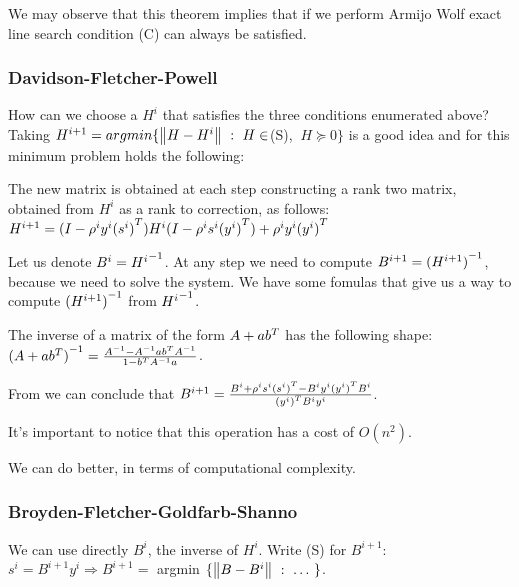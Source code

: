 \documentclass[computational_mathematics.tex]{subfiles}
\begin{document}
\begin{obs}
  We may observe that this theorem implies that if we perform Armijo Wolf exact line search condition (C) can always be satisfied.
\end{obs}

\subsubsection{Davidson-Fletcher-Powell}
How can we choose a $H^i$ that satisfies the three conditions enumerated above? Taking $H^{i+1} =argmin \{\left\lVert H - H^i\right\rVert~:~H \in$(S), $ ~ H \succeq 0\}$ is a good idea and for this minimum problem holds the following:

\begin{theorem}
  The new matrix is obtained at each step constructing a rank two matrix, obtained from $H^i$ as a rank to correction, as follows:
  $H^{i+1} = (I - \rho^i y^i {(s^i)}^{T}) H^i(I - \rho^i s^i {(y^i)}^{T}) + \rho^i y^i {(y^i)}^{T}$
\end{theorem}

Let us denote $B^i = {H^i}^{-1}$.
At any step we need to compute $B^{i+1} = {(H^{i+1})}^{-1}$, because we need to solve the system. We have some fomulas that give us a way to compute ${(H^{i+1})}^{-1}$ from ${H^i}^{-1}$.

\begin{theorem}\label{theo:16novsmw}
  The inverse of a matrix of the form $A + a {b}^{T}$ has the following shape:
  ${(A + a {b}^{T})}^{-1} = \frac{{A}^{-1} - {A}^{-1} a {b}^{T} {A}^{-1}}{1 - {b}^{T} {A}^{-1} a}$.
\end{theorem}

\begin{obs}
  From  we can conclude that $B^{i+1} = \frac{B^i + \rho^i s^i {(s^i)}^{T} - B^i y^i {(y^i)}^{T}B^i}{{(y^i)}^{T} B^i y^i}$.
\end{obs}
It's important to notice that this operation has a cost of $O(n^2)$.

We can do better, in terms of computational complexity.

\subsubsection{Broyden-Fletcher-Goldfarb-Shanno}

We can use directly $B^i$, the inverse of $H^i$.
Write (S) for $B^{i+1}$: $s^i = B^{i+1} y^i \Longrightarrow B^{i+1} =$ argmin $\{\left\lVert B - B^i\right\rVert~:~\ldots~ \}$.
\end{document}
